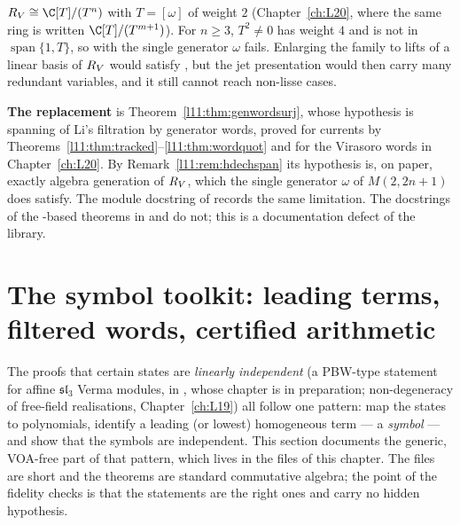 \begin{warning}
\begin{enumerate}
  $\lelevenR\cong\C[T]/(T^{n})$ with $T = [\omega]$ of weight $2$ (Chapter~\ref{ch:L20}, where the same ring is written
  $\C[T]/(T^{m+1})$). For $n\ge3$, $T^2\neq0$ has weight $4$
  and is not in $\operatorname{span}\{1,T\}$, so  with the single generator $\omega$ fails. Enlarging the family
  to lifts of a linear basis of $R_V$ would satisfy , but the jet presentation would then carry many
  redundant variables, and it still cannot reach non-lisse cases.
\end{enumerate}
\textbf{The replacement} is Theorem~\ref{l11:thm:genwordsurj}, whose hypothesis is spanning of Li's filtration by
generator words, proved for currents by Theorems~\ref{l11:thm:tracked}--\ref{l11:thm:wordquot} and for the Virasoro
words in Chapter~\ref{ch:L20}. By Remark~\ref{l11:rem:hdechspan} its hypothesis is, on paper, exactly algebra generation of
$R_V$, which the single generator $\omega$ of $M(2,2n+1)$ does satisfy. The module docstring of
 records the same limitation. The docstrings
of the -based theorems in  and  do not; this
is a documentation defect of the library.
\end{warning}

\section{The symbol toolkit: leading terms, filtered words, certified arithmetic}\label{l11:sec:symbols}

The proofs that certain states are \emph{linearly independent} (a PBW-type statement for affine
$\mathfrak{sl}_3$ Verma modules, in , whose chapter is in
preparation; non-degeneracy of free-field realisations,
Chapter~\ref{ch:L19}) all follow one pattern: map the states to polynomials, identify a leading (or lowest)
homogeneous term --- a \emph{symbol} --- and show that the symbols are independent. This section documents
the generic, VOA-free part of that pattern, which lives in the files of this chapter. The files are short and
the theorems are standard commutative algebra; the point of the fidelity checks is that the statements are
the right ones and carry no hidden hypothesis.

